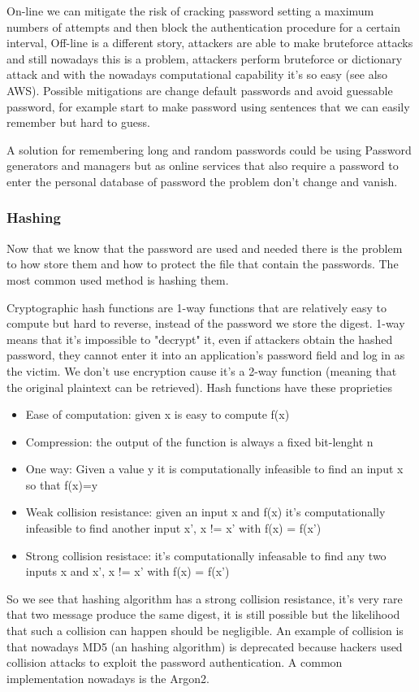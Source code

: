     On-line we can mitigate the risk of cracking password setting a maximum numbers of attempts and then block the authentication procedure for a certain interval, Off-line is a different story, attackers are able to make bruteforce attacks and still nowadays this is a problem, attackers perform bruteforce or dictionary attack and with the nowadays computational capability it's so easy (see also AWS). Possible mitigations are change default passwords and avoid guessable password, for example start to make password using sentences that we can easily remember but hard to guess.

    A solution for remembering long and random passwords could be using Password generators and managers but as online services that also require a password to enter the personal database of password the problem don't change and vanish.
    
    \subsubsection{Hashing}
    Now that we know that the password are used and needed there is the problem to how store them and how to protect the file that contain the passwords. The most common used method is hashing them.
    
    Cryptographic hash functions are 1-way functions that are relatively easy to compute but hard to reverse, instead of the password we store the digest. 1-way means that it's impossible to "decrypt" it, even if attackers obtain the hashed password, they cannot enter it into an application's password field and log in as the victim. We don't use encryption cause it's a 2-way function (meaning that the original plaintext can be retrieved). Hash functions have these proprieties
    \begin{itemize}
        \item Ease of computation: given x is easy to compute f(x)
        \item Compression: the output of the function is always a fixed bit-lenght n
        \item One way: Given a value y it is computationally infeasible to find an input x so that f(x)=y
        \item Weak collision resistance: given an input x and f(x) it's computationally infeasible to find another input x', x != x' with f(x) = f(x')
        \item Strong collision resistace: it's computationally infeasable to find any two inputs x and x', x != x' with f(x) = f(x')
    \end{itemize}
     So we see that hashing algorithm has a strong collision resistance, it's very rare that two message produce the same digest, it is still possible but the likelihood that such a collision can happen should be negligible. An example of collision is that nowadays MD5 (an hashing algorithm) is deprecated because hackers used collision attacks to exploit the password authentication. A common implementation nowadays is the Argon2.
     
